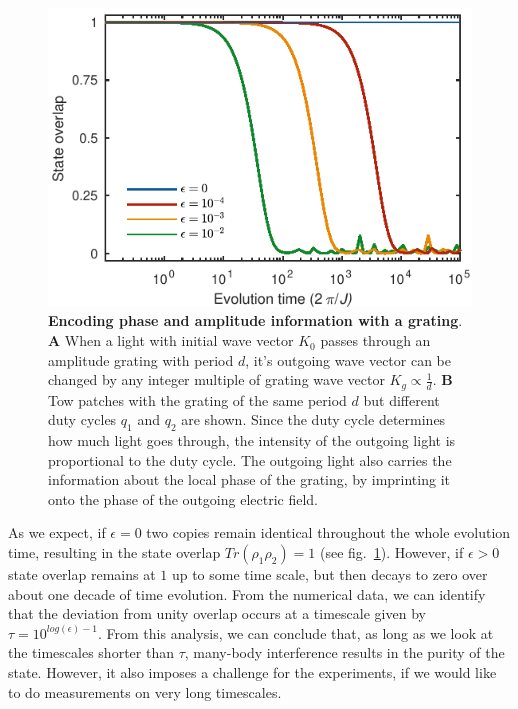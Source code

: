 \begin{figure}[t]
	\centering
	\includegraphics[scale=1]{figures/CBH_overlap.pdf}
	\caption{{\bf Encoding phase and amplitude information with a grating}. {\bf A} When a light with initial wave vector $K_0$ passes through an amplitude grating with period $d$, it's outgoing wave vector can be changed by any integer multiple of grating wave vector $K_g\propto \frac{1}{d}$. {\bf B} Tow patches with the grating of the same period $d$ but different duty cycles $q_1$ and $q_2$ are shown. Since the duty cycle determines how much light goes through, the intensity of the outgoing light is proportional to the duty cycle. The outgoing light also carries the information about the local phase of the grating, by imprinting it onto the phase of the outgoing electric field.}
	\label{fig:CBH_overlap}
\end{figure}


As we expect, if $\epsilon = 0$ two copies remain identical throughout the whole evolution time, resulting in the state overlap $Tr(\rho_1 \rho_2) = 1$ (see fig.~\ref{fig:CBH_overlap}). However, if $\epsilon > 0$ state overlap remains at $1$ up to some time scale, but then decays to zero over about one decade of time evolution. From the numerical data, we can identify that the deviation from unity overlap occurs at a timescale given by $\tau = 10^{log(\epsilon)-1}$. From this analysis, we can conclude that, as long as we look at the timescales shorter than $\tau$, many-body interference results in the purity of the state. However, it also imposes a challenge for the experiments, if we would like to do measurements on very long timescales.


